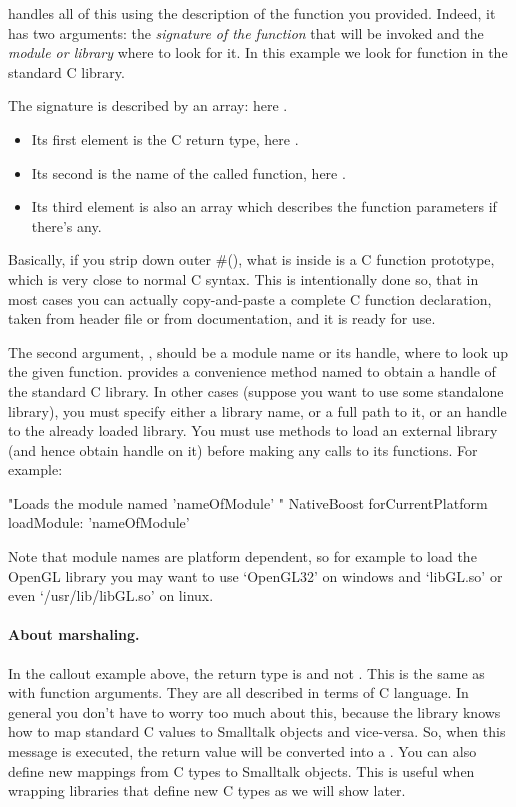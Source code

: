 \documentclass[a4paper,10pt,twoside]{book}
\begin{document}
 handles all of this using the description of the function you provided.
Indeed, it has two arguments: the \emph{signature of the function} that will be invoked and the \emph{module or library} where to look for it.  
In this example we look for  function in the standard C library. 

The signature is described by an array: here .
\begin{itemize} 
\item Its first element is the C return type, here .
\item Its second is the name of the called function, here .
\item Its third element is also an array which describes the function parameters if there's any. 
\end{itemize}

Basically, if you strip down outer \#(), what is inside is a C function prototype, which is very close to normal C syntax. 
This is intentionally done so, that in most cases you can actually copy-and-paste a complete C function declaration, taken from header file or from documentation, and it is ready for use.

The second argument, , should be a module name or its handle, where to look up the given function.
\NativeBoost provides a convenience method named  to obtain a handle of the standard C library. 
In other cases (suppose you want to use some standalone library), you must specify either a library name, or a full path to it, or an handle to the already loaded library.
You must use \NativeBoost methods to load an external library (and hence obtain handle on it) before making any calls to its functions. For example:

\begin{code}{}
"Loads the module named 'nameOfModule' "
NativeBoost forCurrentPlatform loadModule: 'nameOfModule'
\end{code}

Note that module names are platform dependent, so for example to load the OpenGL library you may want to use `OpenGL32' on windows and `libGL.so' or even  `/usr/lib/libGL.so' on linux.


\paragraph{About marshaling.} In the  callout example above, the return type is  and not . This is the same as with function arguments. They are all described in terms of C language. In general you don't have to worry too much about this, because the \NativeBoost library knows how to map standard C values to Smalltalk objects and vice-versa. So, when this message is executed, the return value will be converted into a . 
You can also define new mappings from C types to Smalltalk objects. 
This is useful when wrapping libraries that define new C types as we will show later. 
\end{document}
